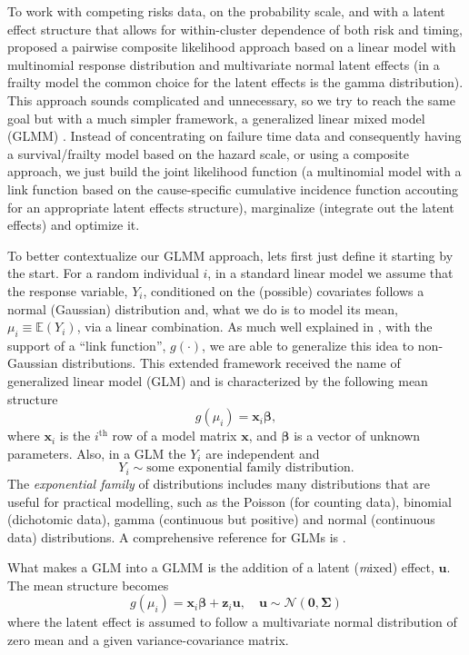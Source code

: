 To work with competing risks data, on the probability scale, and with a
latent effect structure that allows for within-cluster dependence of
both risk and timing,  proposed a pairwise composite
likelihood approach based on a linear model with multinomial response
distribution and multivariate normal latent effects (in a frailty model
the common choice for the latent effects is the gamma distribution).
This approach sounds complicated and unnecessary, so we try to reach the
same goal but with a much simpler framework, a generalized linear mixed
model (GLMM) \cite{GLMM}. Instead of concentrating on failure time data
and consequently having a survival/frailty model based on the hazard
scale, or using a composite approach, we just build the joint likelihood
function (a multinomial model with a link function based on the
cause-specific cumulative incidence function accouting for an
appropriate latent effects structure), marginalize (integrate out the
latent effects) and optimize it.

To better contextualize our GLMM approach, lets first just define it
starting by the start. For a random individual \(i\), in a standard
linear model we assume that the response variable, \(Y_{i}\),
conditioned on the (possible) covariates follows a normal (Gaussian)
distribution and, what we do is to model its mean, \(\mu_{i} \equiv
\mathbb{E}(Y_{i})\), via a linear combination. As much well explained in
, with the support of a ``link function'',
\(g(\cdot)\), we are able to generalize this idea to non-Gaussian
distributions. This extended framework received the name of generalized
linear model (GLM) and is characterized by the following mean structure
\[
 g(\mu_{i}) = \bm{x}_{i}\bm{\beta},
\]
where \(\bm{x}_{i}\) is the \(i^\text{th}\) row of a model matrix
\(\bm{x}\), and \(\bm{\beta}\) is a vector of unknown parameters.
Also, in a GLM the \(Y_{i}\) are independent and
\[
  Y_{i} \sim \text{some exponential family distribution}.
\]
The \textit{exponential family} of distributions includes many
distributions that are useful for practical modelling, such as the
Poisson (for counting data), binomial (dichotomic data), gamma
(continuous but positive) and normal (continuous data) distributions. A
comprehensive reference for GLMs is .

What makes a GLM into a GLMM \cite{GLMM} is the addition of a latent
(\textit{m}ixed) effect, \(\mathbf{u}\). The mean structure becomes
\[
  g(\mu_{i}) = \bm{x}_{i}\bm{\beta} + \mathbf{z}_{i}\mathbf{u},
  \quad \mathbf{u} \sim \mathcal{N}(\mathbf{0},\bm{\Sigma})
\]
where the latent effect is assumed to follow a multivariate normal
distribution of zero mean and a given variance-covariance matrix.

